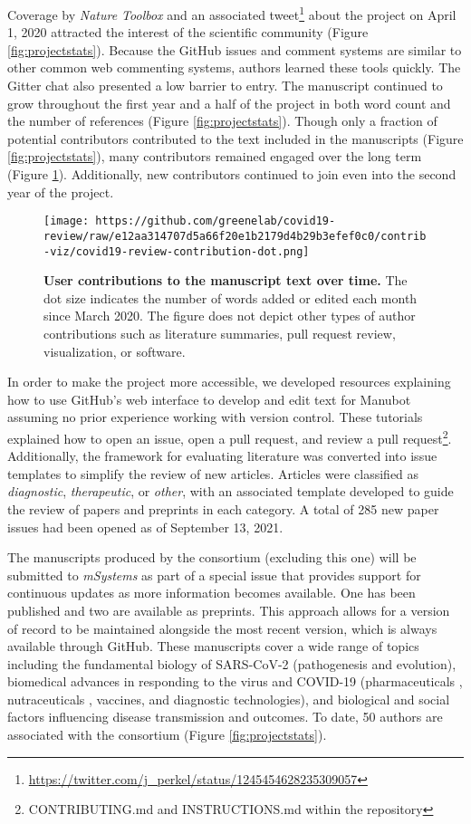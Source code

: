 \documentclass[twocolumn]{ceurart}
\begin{document}
Coverage by \emph{Nature Toolbox} \citep{AE0QcVgJ} and an associated tweet\footnote{\url{https://twitter.com/j_perkel/status/1245454628235309057}} about the project on April 1, 2020 attracted the interest of the scientific community (Figure \ref{fig:projectstats}).
Because the GitHub issues and comment systems are similar to other common web commenting systems, authors learned these tools quickly.
The Gitter chat also presented a low barrier to entry.
The manuscript continued to grow throughout the first year and a half of the project in both word count and the number of references (Figure \ref{fig:projectstats}).
Though only a fraction of potential contributors contributed to the text included in the manuscripts (Figure \ref{fig:projectstats}), many contributors remained engaged over the long term (Figure \ref{fig:projectdots}).
Additionally, new contributors continued to join even into the second year of the project.

\begin{figure}
\hypertarget{fig:projectdots}{%
\centering
\texttt{[image: https://github.com/greenelab/covid19-review/raw/e12aa314707d5a66f20e1b2179d4b29b3efef0c0/contrib-viz/covid19-review-contribution-dot.png]}
\caption{\textbf{User contributions to the manuscript text over time.}
The dot size indicates the number of words added or edited each month since March 2020.
The figure does not depict other types of author contributions such as literature summaries, pull request review, visualization, or software.}\label{fig:projectdots}
}
\end{figure}

In order to make the project more accessible, we developed resources explaining how to use GitHub's web interface to develop and edit text for Manubot assuming no prior experience working with version control.
These tutorials explained how to open an issue, open a pull request, and review a pull request\footnote{CONTRIBUTING.md and INSTRUCTIONS.md within the
  repository}.
Additionally, the framework for evaluating literature was converted into issue templates to simplify the review of new articles.
Articles were classified as \emph{diagnostic}, \emph{therapeutic}, or \emph{other}, with an associated template developed to guide the review of papers and preprints in each category.
A total of 285 new paper issues had been opened as of September 13, 2021.

The manuscripts produced by the consortium (excluding this one) will be submitted to \emph{mSystems} as part of a special issue that provides support for continuous updates as more information becomes available.
One has been published and two are available as preprints.
This approach allows for a version of record to be maintained alongside the most recent version, which is always available through GitHub.
These manuscripts cover a wide range of topics including the fundamental biology of SARS-CoV-2 (pathogenesis \citep{GdZc4Yyd} and evolution), biomedical advances in responding to the virus and COVID-19 (pharmaceuticals \citep{njpLhBui}, nutraceuticals \citep{wgAGKcBj}, vaccines, and diagnostic technologies), and biological and social factors influencing disease transmission and outcomes.
To date, 50 authors are associated with the consortium (Figure \ref{fig:projectstats}).
\end{document}

